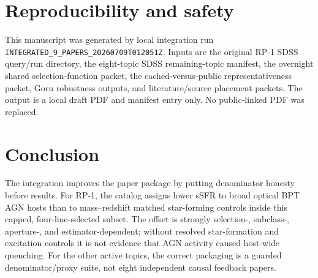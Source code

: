 \documentclass[twocolumn]{aastex631}
\begin{document}
\section{Reproducibility and safety}\label{sec:repro}
This manuscript was generated by local integration run \texttt{INTEGRATED\_9\_PAPERS\_20260709T012051Z}. Inputs are the original RP-1 SDSS query/run directory, the eight-topic SDSS remaining-topic manifest, the overnight shared selection-function packet, the cached-versus-public representativeness packet, Goru robustness outputs, and literature/source placement packets. The output is a local draft PDF and manifest entry only. No public-linked PDF was replaced.

\section{Conclusion}\label{sec:conclusion}
The integration improves the paper package by putting denominator honesty before results. For RP-1, the catalog assigns lower sSFR to broad optical BPT AGN hosts than to mass--redshift matched star-forming controls inside this capped, four-line-selected subset. The offset is strongly selection-, subclass-, aperture-, and estimator-dependent; without resolved star-formation and excitation controls it is not evidence that AGN activity caused host-wide quenching. For the other active topics, the correct packaging is a guarded denominator/proxy suite, not eight independent causal feedback papers.
\end{document}
